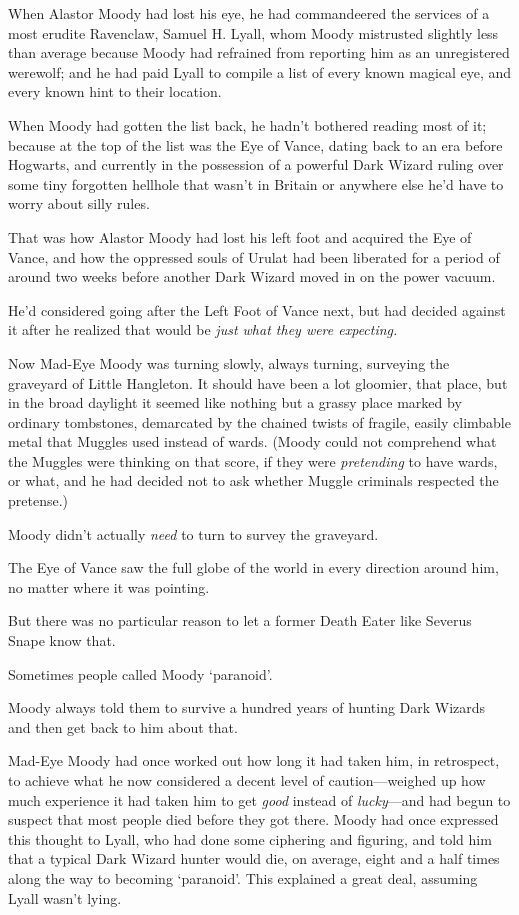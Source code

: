 When Alastor Moody had lost his eye, he had commandeered the services of a most 
erudite Ravenclaw, Samuel H. Lyall, whom Moody mistrusted slightly less than 
average because Moody had refrained from reporting him as an unregistered 
werewolf; and he had paid Lyall to compile a list of every known magical eye, 
and every known hint to their location.

When Moody had gotten the list back, he hadn't bothered reading most of it; 
because at the top of the list was the Eye of Vance, dating back to an era 
before Hogwarts, and currently in the possession of a powerful Dark Wizard 
ruling over some tiny forgotten hellhole that wasn't in Britain or anywhere 
else he'd have to worry about silly rules.

That was how Alastor Moody had lost his left foot and acquired the Eye of 
Vance, and how the oppressed souls of Urulat had been liberated for a period of 
around two weeks before another Dark Wizard moved in on the power vacuum.

He'd considered going after the Left Foot of Vance next, but had decided 
against it after he realized that would be \emph{just what they were expecting.}

Now Mad-Eye Moody was turning slowly, always turning, surveying the graveyard 
of Little Hangleton. It should have been a lot gloomier, that place, but in the 
broad daylight it seemed like nothing but a grassy place marked by ordinary 
tombstones, demarcated by the chained twists of fragile, easily climbable metal 
that Muggles used instead of wards. (Moody could not comprehend what the 
Muggles were thinking on that score, if they were \emph{pretending} to have 
wards, or what, and he had decided not to ask whether Muggle criminals 
respected the pretense.)

Moody didn't actually \emph{need} to turn to survey the graveyard.

The Eye of Vance saw the full globe of the world in every direction around him, 
no matter where it was pointing.

But there was no particular reason to let a former Death Eater like Severus 
Snape know that.

Sometimes people called Moody `paranoid'.

Moody always told them to survive a hundred years of hunting Dark Wizards and 
then get back to him about that.

Mad-Eye Moody had once worked out how long it had taken him, in retrospect, to 
achieve what he now considered a decent level of caution---weighed up how much 
experience it had taken him to get \emph{good} instead of \emph{lucky}---and 
had begun to suspect that most people died before they got there. Moody had 
once expressed this thought to Lyall, who had done some ciphering and figuring, 
and told him that a typical Dark Wizard hunter would die, on average, eight and 
a half times along the way to becoming `paranoid'. This explained a great deal, 
assuming Lyall wasn't lying.

